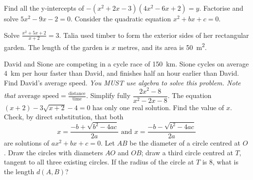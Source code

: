 \begin{questions}
  \question Find all the y-intercepts of $ -(x^2 + 2x - 3)(4x^2 - 6x + 2) = y $.
  \question Factorise and solve $ 5x^2 - 9x - 2 = 0 $.
  \question Consider the quadratic equation $ x^2 + bx + c = 0 $.
  \question Solve $ \frac{x^2 + 5x + 2}{x + 2} = 3 $.
  \question Talia used timber to form the exterior sides of her rectangular garden. The length
            of the garden is $ x $ metres, and its area is \SI{50}{\metre\squared}.
  \question David and Sione are competing in a cycle race of \SI{150}{\kilo\metre}. Sione cycles on average \SI{4}{\kilo\metre} per hour
            faster than David, and finishes half an hour earlier than David. Find David's average speed. \textit{You MUST use algebra to
            solve this problem. Note that $ \text{average speed} = \frac{\text{distance}}{\text{time}} $.}
  \question Simplify fully $ \dfrac{2x^2 - 8}{x^2 - 2x - 8} $.
  \question The equation $ (x + 2) - 3\sqrt{x + 2} - 4 = 0 $ has only one real solution. Find the value of $ x $.
  \question Check, by direct substitution, that both
            \begin{displaymath}
              x = \frac{-b + \sqrt{b^2 - 4ac}}{2a} \text{ and } x = \frac{-b - \sqrt{b^2 - 4ac}}{2a}
            \end{displaymath}
            are solutions of $ ax^2 + bx + c = 0 $.
  \question Let $ AB $ be the diameter of a circle centred at $ O $. Draw the circles with diameters $ AO $ and $ OB $; draw a
            third circle centred at $ T $, tangent to all three existing circles. If the radius of the circle at $ T $ is 8,
            what is the length $ d(A,B) $?


\end{questions}
